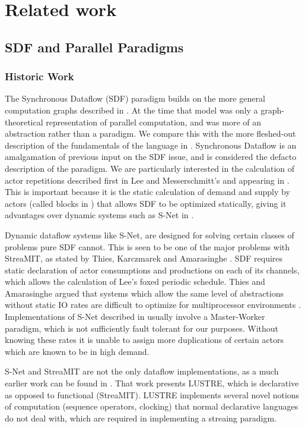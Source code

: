 \chapter{Related work}

\section{SDF and Parallel Paradigms}

\subsection{Historic Work}

The Synchronous Dataflow (SDF) paradigm builds on the more general computation graphs described in \cite{kar66}.
At the time that model was only a graph-theoretical representation of parallel computation, and was more of an abstraction rather than a paradigm.
We compare this with the more fleshed-out description of the fundamentals of the language in \cite{sdfBook}.
Synchronous Dataflow is an amalgamation of previous input on the SDF issue, and is considered the defacto description of the paradigm.
We are particularly interested in the calculation of actor repetitions described first in Lee and Messerschmitt's \cite{lee87} and appearing in \cite{sdfBook}.
This is important because it is the static calculation of demand and supply by actors (called blocks in \cite{lee87}) that allows SDF to be optimized statically, giving it advantages over dynamic systems such as S-Net in \cite{pen09}.

Dynamic dataflow systems like S-Net, are designed for solving certain classes of problems pure SDF cannot.
This is seen to be one of the major problems with StreaMIT, as stated by Thies, Karczmarek and Amarasinghe \cite{thies02}.
SDF requires static declaration of actor consumptions and productions on each of its channels, which allows the calculation of Lee's foxed periodic schedule.
Thies and Amarasinghe argued that systems which allow the same level of abstractions without static IO rates are difficult to optimize for multiprocessor environments \cite{thies10}.
Implementations of S-Net described in \cite{pen09} usually involve a Master-Worker paradigm, which is not sufficiently fault tolerant for our purposes.
Without knowing these rates it is unable to assign more duplications of certain actors which are known to be in high demand.

S-Net and StreaMIT are not the only dataflow implementations, as a much earlier work can be found in \cite{cas87}.
That work presents LUSTRE, which is declarative as opposed to functional (StreaMIT).
LUSTRE implements several novel notions of computation (sequence operators, clocking) that normal declarative languages do not deal with, which are required in implementing a streaing paradigm.

